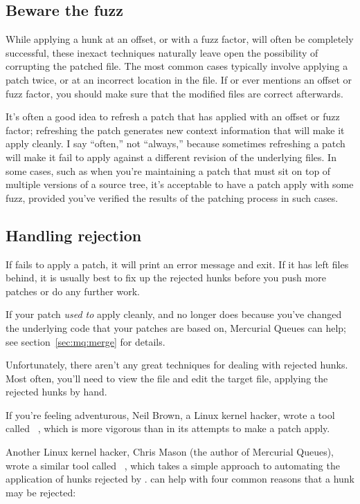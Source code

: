 \subsection{Beware the fuzz}

While applying a hunk at an offset, or with a fuzz factor, will often
be completely successful, these inexact techniques naturally leave
open the possibility of corrupting the patched file.  The most common
cases typically involve applying a patch twice, or at an incorrect
location in the file.  If  or  ever
mentions an offset or fuzz factor, you should make sure that the
modified files are correct afterwards.  

It's often a good idea to refresh a patch that has applied with an
offset or fuzz factor; refreshing the patch generates new context
information that will make it apply cleanly.  I say ``often,'' not
``always,'' because sometimes refreshing a patch will make it fail to
apply against a different revision of the underlying files.  In some
cases, such as when you're maintaining a patch that must sit on top of
multiple versions of a source tree, it's acceptable to have a patch
apply with some fuzz, provided you've verified the results of the
patching process in such cases.

\subsection{Handling rejection}

If  fails to apply a patch, it will print an error
message and exit.  If it has left  files behind, it is
usually best to fix up the rejected hunks before you push more patches
or do any further work.

If your patch \emph{used to} apply cleanly, and no longer does because
you've changed the underlying code that your patches are based on,
Mercurial Queues can help; see section~\ref{sec:mq:merge} for details.

Unfortunately, there aren't any great techniques for dealing with
rejected hunks.  Most often, you'll need to view the 
file and edit the target file, applying the rejected hunks by hand.

If you're feeling adventurous, Neil Brown, a Linux kernel hacker,
wrote a tool called ~\cite{web:wiggle}, which is more
vigorous than  in its attempts to make a patch apply.

Another Linux kernel hacker, Chris Mason (the author of Mercurial
Queues), wrote a similar tool called ~\cite{web:rej},
which takes a simple approach to automating the application of hunks
rejected by .   can help with four common
reasons that a hunk may be rejected:

